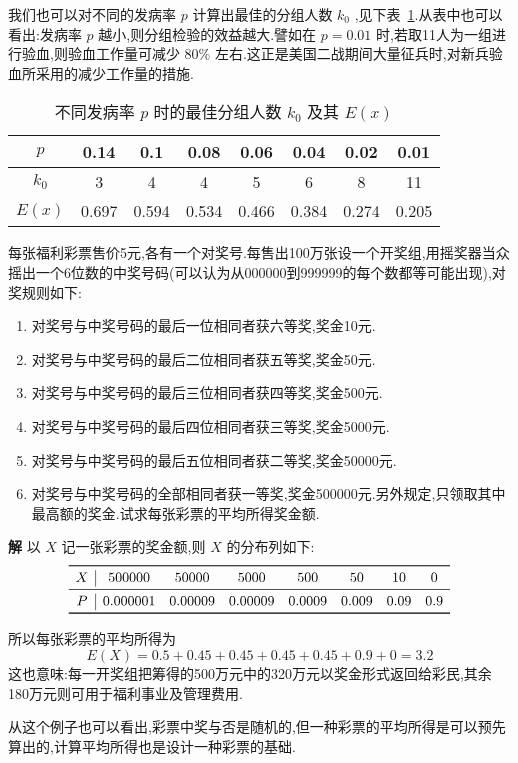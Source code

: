 我们也可以对不同的发病率 $ p $ 计算出最佳的分组人数 $ k_0 $ ,见下表~\ref{tab:2.2.2}.从表中也可以看出:发病率 $ p $ 越小,则分组检验的效益越大.譬如在 $ p=0.01 $ 时,若取11人为一组进行验血,则验血工作量可减少 $ 80\% $ 左右.这正是美国二战期间大量征兵时,对新兵验血所采用的减少工作量的措施.

\begin{table}[htbp]
	\centering
	\caption{不同发病率 $ p $ 时的最佳分组人数 $ k_0 $ 及其 $ E(x) $ }
	\begin{tabular}{c|ccccccc}
		\toprule
		 $ p $ & 0.14  & 0.1   & 0.08  & 0.06  & 0.04  & 0.02  & 0.01 \\\midrule
		 $ k_0 $ & 3     & 4     & 4     & 5     & 6     & 8     & 11 \\\midrule
		 $ E(x) $ & 0.697 & 0.594 & 0.534 & 0.466 & 0.384 & 0.274 & 0.205 \\\bottomrule
	\end{tabular}%
	\label{tab:2.2.2}%
\end{table}%

\begin{example}\label{exam:2.2.3}
	每张福利彩票售价5元,各有一个对奖号.每售出100万张设一个开奖组,用摇奖器当众摇出一个6位数的中奖号码(可以认为从000000到999999的每个数都等可能出现),对奖规则如下:
	\begin{enumerate}
		\item 对奖号与中奖号码的最后一位相同者获六等奖,奖金10元.
		\item 对奖号与中奖号码的最后二位相同者获五等奖,奖金50元.
		\item 对奖号与中奖号码的最后三位相同者获四等奖,奖金500元.
		\item 对奖号与中奖号码的最后四位相同者获三等奖,奖金5000元.
		\item 对奖号与中奖号码的最后五位相同者获二等奖,奖金50000元.
		\item 对奖号与中奖号码的全部相同者获一等奖,奖金500000元.另外规定,只领取其中最高额的奖金.试求每张彩票的平均所得奖金额.
	\end{enumerate}
	
	\textbf{解} 以 $ X $ 记一张彩票的奖金额,则 $ X $ 的分布列如下:
	\[
	\begin{array}{c|ccccccc}
	\toprule
	X     & 500000 & 50000 & 5000  & 500   & 50    & 10    & 0 \\\midrule
	P     & 0.000001 & 0.00009 & 0.00009 & 0.0009 & 0.009 & 0.09  & 0.9 \\\bottomrule
	\end{array}
	\]
	
	
	所以每张彩票的平均所得为
	\[ 
	E(X)=0.5+0.45+0.45+0.45+0.45+0.9+0=3.2
	\]
	这也意味:每一开奖组把筹得的500万元中的320万元以奖金形式返回给彩民,其余180万元则可用于福利事业及管理费用.
	
	从这个例子也可以看出,彩票中奖与否是随机的,但一种彩票的平均所得是可以预先算出的,计算平均所得也是设计一种彩票的基础.
	
\end{example}

